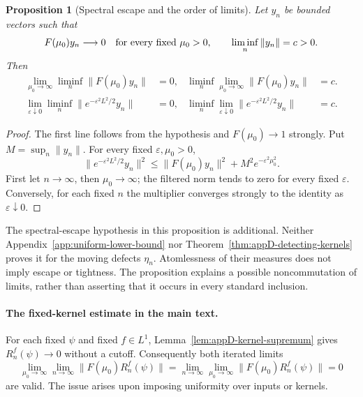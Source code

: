 \documentclass[a4paper,11pt]{article}
\newtheorem{proposition}[theorem]{Proposition}
\theoremstyle{definition}
\begin{document}
\begin{proposition}[Spectral escape and the order of limits]
\label{prop:appD-order-limits}
Let $y_n$ be bounded vectors such that
\[
 F(\mu_0)y_n\longrightarrow0\quad\hbox{for every fixed }\mu_0>0,
 \qquad \liminf_n\|y_n\|=c>0.
\]
Then
\begin{align}
 \lim_{\mu_0\to\infty}\liminf_n\|F(\mu_0)y_n\|&=0,
 &
 \liminf_n\lim_{\mu_0\to\infty}\|F(\mu_0)y_n\|&=c .
 \label{eq:appD-cutoff-order}\\
 \lim_{\varepsilon\downarrow0}\liminf_n
       \|e^{-\varepsilon^2L^2/2}y_n\|&=0,
 &
 \liminf_n\lim_{\varepsilon\downarrow0}
       \|e^{-\varepsilon^2L^2/2}y_n\|&=c .
 \label{eq:appD-smooth-order}
\end{align}
\end{proposition}
\begin{proof}
The first line follows from the hypothesis and $F(\mu_0)\to1$ strongly.
Put $M=\sup_n\|y_n\|$. For every fixed $\varepsilon,\mu_0>0$,
\[
 \|e^{-\varepsilon^2L^2/2}y_n\|^2
 \le\|F(\mu_0)y_n\|^2+M^2e^{-\varepsilon^2\mu_0^2}.
\]
First let $n\to\infty$, then $\mu_0\to\infty$; the filtered norm tends to zero
for every fixed $\varepsilon$. Conversely, for each fixed $n$ the multiplier
converges strongly to the identity as $\varepsilon\downarrow0$.
\end{proof}

The spectral-escape hypothesis in this proposition is additional.
Neither Appendix~\ref{app:uniform-lower-bound} nor
Theorem~\ref{thm:appD-detecting-kernels} proves it for the moving defects
$\eta_n$. Atomlessness of their measures does not imply escape or tightness.
The proposition explains a possible noncommutation of limits, rather than
asserting that it occurs in every standard inclusion.

\paragraph{The fixed-kernel estimate in the main text.}
For each fixed $\psi$ and fixed $f\in L^1$, Lemma~\ref{lem:appD-kernel-supremum}
gives $R_n^f(\psi)\to0$ without a cutoff. Consequently both iterated limits
\[
 \lim_{\mu_0\to\infty}\lim_{n\to\infty}
       \|F(\mu_0)R_n^f(\psi)\|
 =
 \lim_{n\to\infty}\lim_{\mu_0\to\infty}
       \|F(\mu_0)R_n^f(\psi)\|=0
\]
are valid. The issue arises upon imposing uniformity over inputs or kernels.
\end{document}
